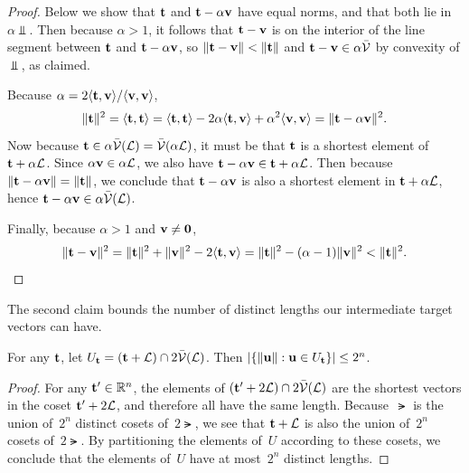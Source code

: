 \documentclass[11pt]{article}
\begin{document}
\begin{proof}
  Below we show that $\vect$ and $\vect-\alpha \vecv$ have equal norms, and that both lie in $\alpha \Vbar$.
  Then because $\alpha > 1$, it follows that $\vect-\vecv$ is on the interior of the line segment between $\vect$ and $\vect - \alpha \vecv$, so $\length{\vect - \vecv} < \length{\vect}$ and $\vect - \vecv \in \alpha \Vbar$ by convexity of $\Vbar$, as claimed.

  Because $\alpha = 2 \inner{\vect, \vecv}/\inner{\vecv, \vecv}$,
  \begin{equation}
    \length{\vect}^{2} = \inner{\vect,\vect} =
    \inner{\vect, \vect} - 2 \alpha \inner{\vect, \vecv} + \alpha^{2} \inner{\vecv, \vecv}
    = \length{\vect- \alpha \vecv}^{2}. 
  \end{equation}
  Now because $\vect \in \alpha \Vbar(\lat) = \Vbar(\alpha \lat)$, it must be that $\vect$ is a shortest element of $\vect + \alpha\lat$.
  Since $\alpha \vecv \in \alpha \lat$, we also have $\vect - \alpha \vecv \in \vect + \alpha \lat$.
  Then because $\length{\vect - \alpha \vecv} = \length{\vect}$, we conclude that $\vect-\alpha\vecv$ is also a shortest element in $\vect + \alpha \lat$, hence $\vect-\alpha \vecv \in \alpha \Vbar(\lat)$.

  Finally, because $\alpha > 1$ and $\vecv \neq \veczero$,
  \[\length{\vect-\vecv}^{2} = \length{\vect}^2 + \length{\vecv}^2 - 2
    \inner{\vect, \vecv} = \length{\vect}^2 - (\alpha-1) \length{\vecv}^2 < \length{\vect}^2.
  \]
\end{proof}

\noindent
The second claim bounds the number of distinct lengths our intermediate target vectors can have.

\begin{claim}%
  \label{clm:distinct-lengths}
  For any $\vect$, let $U_{\vect} = (\vect + \lat) \cap 2\Vbar(\lat)$.
  Then $\abs*{ \set*{ \length{\vecu} : \vecu \in U_{\vect}}} \leq 2^n$.
\end{claim}

\begin{proof}
  For any $\vect' \in \R^n$, the elements of $(\vect' + 2\lat) \cap 2\Vbar (\lat)$ are the shortest vectors in the coset $\vect' + 2\lat$, and therefore all have the same length.
  Because~$\lat$ is the union of~$2^{n}$ distinct cosets of~$2\lat$, we see that $\vect + \lat$ is also the union of~$2^n$ cosets of~$2\lat$.
  By partitioning the elements of~$U$ according to these cosets, we conclude that the elements of~$U$ have at most~$2^n$ distinct lengths.
\end{proof}
\end{document}
